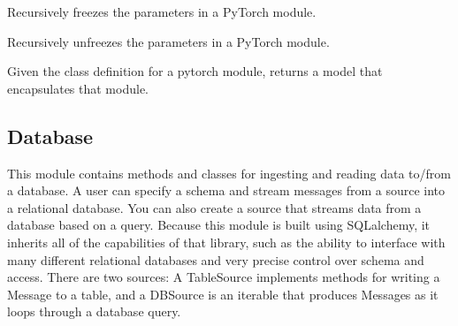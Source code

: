 \documentclass[letterpaper,10pt,english]{sphinxmanual}
\begin{document}

\begin{fulllineitems}
\label{\detokenize{Fireworks:Fireworks.core.model.freeze_module}}
Recursively freezes the parameters in a PyTorch module.

\end{fulllineitems}


\begin{fulllineitems}
\label{\detokenize{Fireworks:Fireworks.core.model.unfreeze_module}}
Recursively unfreezes the parameters in a PyTorch module.

\end{fulllineitems}


\begin{fulllineitems}
\label{\detokenize{Fireworks:Fireworks.core.model.model_from_module}}
Given the class definition for a pytorch module, returns a model that
encapsulates that module.

\end{fulllineitems}



\subsection{Database}
\label{\detokenize{Fireworks:database}}
This module contains methods and classes for ingesting and reading data to/from a database. A user can specify a schema and stream messages
from a source into a relational database. You can also create a source that streams data from a database based on a query. Because this
module is built using SQLalchemy, it inherits all of the capabilities of that library, such as the ability to interface with many different
relational databases and very precise control over schema and access.
There are two sources: A TableSource implements methods for writing a Message to a table, and a DBSource is an iterable that produces
Messages as it loops through a database query.
\end{document}
